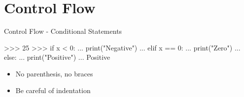 \documentclass[10pt]{beamer}
\begin{document}

%
%
%
%
%
%


\section{Control Flow}


\begin{frame}[fragile]{Control Flow - Conditional Statements}

    \begin{pythoncode}
        >>> 25
        >>> if x < 0:
        ...     print("Negative")
        ... elif x == 0:
        ...     print("Zero")
        ... else:
        ...     print("Positive")
        ...
        Positive

    \end{pythoncode}

    \begin{itemize}
        \item \pause No parenthesis, no braces
        \item \pause Be careful of indentation
    \end{itemize}

\end{frame}
\end{document}
